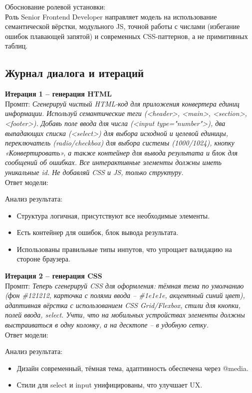 \indent
Обоснование ролевой установки: \\
Роль Senior Frontend Developer направляет модель на использование семантической вёрстки, модульного JS, точной работы с числами (избегание ошибок плавающей запятой) и современных CSS-паттернов, а не примитивных таблиц.

\subsection{Журнал диалога и итераций}
\textbf{Итерация 1 – генерация HTML} \\
\indent
Промпт:
\textit{Сгенерируй чистый HTML-код для приложения конвертера единиц информации. Используй семантические теги (<header>, <main>, <section>, <footer>). Добавь поле ввода для числа (<input type="number">), два выпадающих списка (<select>) для выбора исходной и целевой единицы, переключатель (radio/checkbox) для выбора системы (1000/1024), кнопку «Конвертировать», а также контейнер для вывода результата и блок для сообщений об ошибках. Все интерактивные элементы должны иметь уникальные id. Не добавляй CSS и JS, только структуру.} \\

\indent
Ответ модели:

Анализ результата:
\begin{itemize}
\item Структура логичная, присутствуют все необходимые элементы.
\item Есть контейнер для ошибок, блок вывода результата.
\item Использованы правильные типы инпутов, что упрощает валидацию на стороне браузера.
\end{itemize}

\textbf{Итерация 2 – генерация CSS} \\
\indent
Промпт:
\textit{Теперь сгенерируй CSS для оформления: тёмная тема по умолчанию (фон \#121212, карточка с полями ввода – \#1e1e1e, акцентный синий цвет), адаптивная вёрстка с использованием CSS Grid/Flexbox, стили для кнопки, полей ввода, select. Учти, что на мобильных устройствах элементы должны выстраиваться в одну колонку, а на десктопе – в удобную сетку.} \\

\indent
Ответ модели:


\indent
Анализ результата:
\begin{itemize}
\item Дизайн современный, тёмная тема, адаптивность обеспечена через @media.
\item Стили для select и input унифицированы, что улучшает UX.
\end{itemize}

